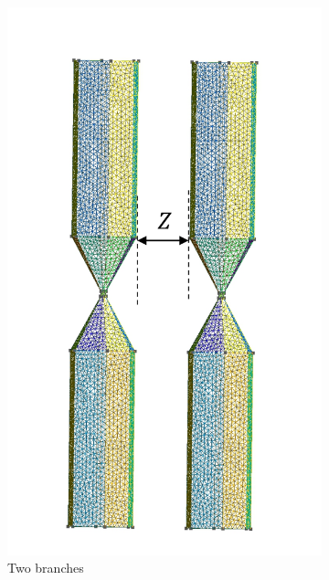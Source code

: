 \begin{figure}[H]
    \begin{subfigure}{0.3\linewidth}
        \centering
        \includegraphics[scale = 0.4]{figures/2branches}
        \caption{Two branches}
        \end{subfigure}
        \begin{subfigure}{0.3\linewidth}
            \centering

\end{subfigure}
\end{figure}
